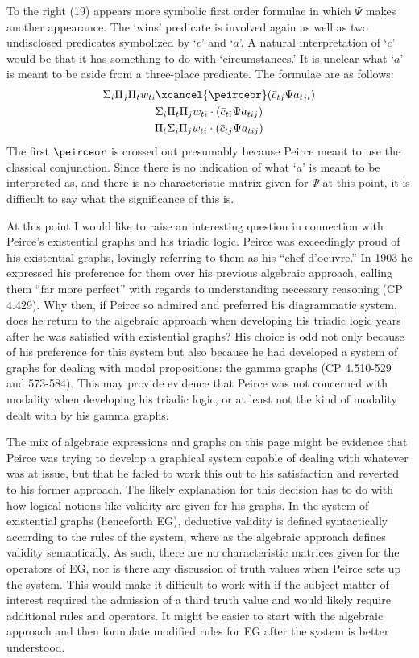 To the right (19) appears more symbolic first order formulae in which $\Psi$ makes another appearance. The `wins' predicate is involved again as well as two undisclosed predicates symbolized by `$c$' and `$a$'. A natural interpretation of `$c$' would be that it has something to do with `circumstances.' It is unclear what `$a$' is meant to be aside from a three-place predicate. The formulae are as follows:
\begin{gather*}
\Sigma_{i} \Pi_{j} \Pi_{t} w_{ti} \xcancel{\peirceor} (\bar{c}_{tj} \Psi a_{tji}) \\
 \Sigma_{i} \Pi_{t} \Pi_{j} w_{ti} \cdot (\bar{c}_{ti} \Psi a_{tij}) \\
  \Pi_{t} \Sigma_{i} \Pi_{j} w_{ti} \cdot (\bar{c}_{tj} \Psi a_{tij})
\end{gather*}
The first $\peirceor$ is crossed out presumably because Peirce meant to use the classical conjunction. Since there is no indication of what `$a$' is meant to be interpreted as, and there is no characteristic matrix given for $\Psi$ at this point, it is difficult to say what the significance of this is.

At this point I would like to raise an interesting question in connection with Peirce's existential graphs and his triadic logic. Peirce was exceedingly proud of his existential graphs, lovingly referring to them as his ``chef d'oeuvre.'' In 1903 he expressed his preference for them over his previous algebraic approach, calling them ``far more perfect'' with regards to understanding necessary reasoning (CP 4.429). Why then, if Peirce so admired and preferred his diagrammatic system, does he return to the algebraic approach when developing his triadic logic years after he was satisfied with existential graphs? His choice is odd not only because of his preference for this system but also because he had developed a system of graphs for dealing with modal propositions: the gamma graphs (CP 4.510-529 and 573-584). This may provide evidence that Peirce was not concerned with modality when developing his triadic logic, or at least not the kind of modality dealt with by his gamma graphs.

The mix of algebraic expressions and graphs on this page might be evidence that Peirce was trying to develop a graphical system capable of dealing with whatever was at issue, but that he failed to work this out to his satisfaction and reverted to his former approach. The likely explanation for this decision has to do with how logical notions like validity are given for his graphs. In the system of existential graphs (henceforth EG), deductive validity is defined syntactically according to the rules of the system, where as the algebraic approach defines validity semantically. As such, there are no characteristic matrices given for the operators of EG, nor is there any discussion of truth values when Peirce sets up the system. This would make it difficult to work with if the subject matter of interest required the admission of a third truth value and would likely require additional rules and operators. It might be easier to start with the algebraic approach and then formulate modified rules for EG after the system is better understood.

